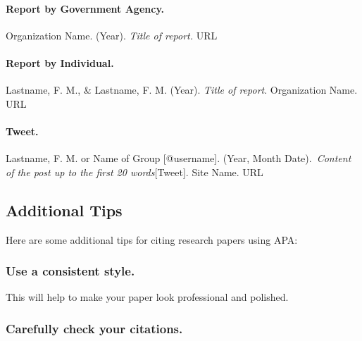 \documentclass[
  b5paper]{book}
\begin{document}
\hypertarget{report-by-government-agency.}{%
\paragraph*{Report by Government Agency.}\label{report-by-government-agency.}}

Organization Name. (Year). \emph{Title of report.} URL

\hypertarget{report-by-individual.}{%
\paragraph*{Report by Individual.}\label{report-by-individual.}}

Lastname, F. M., \& Lastname, F. M. (Year). \emph{Title of report}. Organization Name. URL

\hypertarget{tweet.}{%
\paragraph*{Tweet.}\label{tweet.}}

Lastname, F. M. or Name of Group {[}@username{]}. (Year, Month Date).~\emph{Content of the post up to the first 20 words}{[}Tweet{]}. Site Name. URL

\hypertarget{additional-tips-1}{%
\subsection*{Additional Tips}\label{additional-tips-1}}

Here are some additional tips for citing research papers using APA:

\hypertarget{use-a-consistent-style.}{%
\subsubsection*{Use a consistent style.}\label{use-a-consistent-style.}}

This will help to make your paper look professional and polished.

\hypertarget{carefully-check-your-citations.}{%
\subsubsection*{Carefully check your citations.}\label{carefully-check-your-citations.}}
\end{document}
